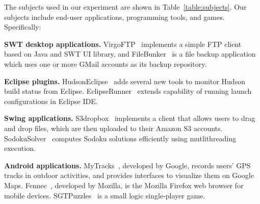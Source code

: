 The subjects used in our experiment are shown in Table~\ref{table:subjects}. Our
subjects include end-user applications, programming tools, and games. Specifically:

\begin{itemize}
\Item \textbf{SWT desktop applications.}
VirgoFTP~\cite{virgo} implements a simple FTP client based on Java and SWT UI library, and
FileBunker~\cite{filebunker} is a file backup application which uses one or more GMail accounts as its backup repository.

\Item \textbf{Eclipse plugins.}
HudsonEclipse~\cite{hudson} adds several new tools to  monitor Hudson build status from Eclipse.
EclipseRunner~\cite{eclipserunner} extends capability of running launch configurations in Eclipse IDE.

\Item \textbf{Swing applications.} %
S3dropbox~\cite{s3dropbox} implements a client that allows users
to drag and drop files, which are then uploaded to their Amazon S3 accounts. SodokuSolver~\cite{sudokusolver}
computes Sodoku solutions efficiently using mutlithreading execution. 

\Item  \textbf{Android applications.} %
MyTracks~\cite{mytracks}, developed by Google, records users' GPS tracks in outdoor activities, and provides
interfaces to visualize them on Google Maps. Fennec~\cite{fennec}, developed by Mozilla, is the Mozilla
Firefox web browser for mobile devices. SGTPuzzles~\cite{sgtpuzzles} is a small logic single-player game.

\end{itemize}


